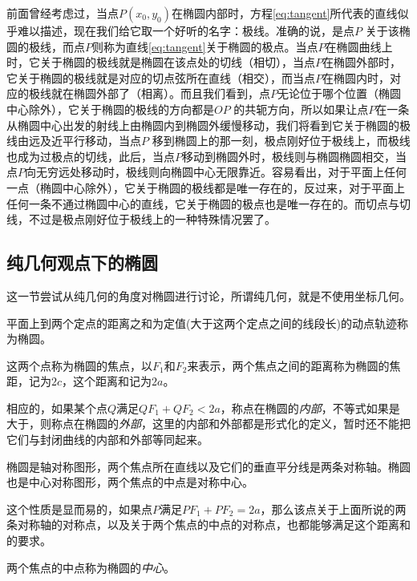 前面曾经考虑过，当点$P(x_0,y_0)$在椭圆内部时，方程\ref{eq:tangent}所代表的直线似乎难以描述，现在我们给它取一个好听的名字：极线。准确的说，是点$P$ 关于该椭圆的极线，而点$P$则称为直线\ref{eq:tangent}关于椭圆的极点。当点$P$在椭圆曲线上时，它关于椭圆的极线就是椭圆在该点处的切线（相切），当点$P$在椭圆外部时，它关于椭圆的极线就是对应的切点弦所在直线（相交），而当点$P$在椭圆内时，对应的极线就在椭圆外部了（相离）。而且我们看到，点$P$无论位于哪个位置（椭圆中心除外），它关于椭圆的极线的方向都是$OP$ 的共轭方向，所以如果让点$P$在一条从椭圆中心出发的射线上由椭圆内到椭圆外缓慢移动，我们将看到它关于椭圆的极线由远及近平行移动，当点$P$ 移到椭圆上的那一刻，极点刚好位于极线上，而极线也成为过极点的切线，此后，当点$P$移动到椭圆外时，极线则与椭圆椭圆相交，当点$P$向无穷远处移动时，极线则向椭圆中心无限靠近。容易看出，对于平面上任何一点（椭圆中心除外），它关于椭圆的极线都是唯一存在的，反过来，对于平面上任何一条不通过椭圆中心的直线，它关于椭圆的极点也是唯一存在的。而切点与切线，不过是极点刚好位于极线上的一种特殊情况罢了。

\subsection{纯几何观点下的椭圆}
\label{sec:oval-on-geometry}

这一节尝试从纯几何的角度对椭圆进行讨论，所谓纯几何，就是不使用坐标几何。

\begin{definition}
  平面上到两个定点的距离之和为定值(大于这两个定点之间的线段长)的动点轨迹称为椭圆。
\end{definition}

这两个点称为椭圆的焦点，以$F_1$和$F_2$来表示，两个焦点之间的距离称为椭圆的焦距，记为$2c$，这个距离和记为$2a$。

相应的，如果某个点$Q$满足$QF_1+QF_2<2a$，称点在椭圆的\emph{内部}，不等式如果是大于，则称点在椭圆的\emph{外部}，这里的内部和外部都是形式化的定义，暂时还不能把它们与封闭曲线的内部和外部等同起来。

\begin{property}
  椭圆是轴对称图形，两个焦点所在直线以及它们的垂直平分线是两条对称轴。椭圆也是中心对称图形，两个焦点的中点是对称中心。
\end{property}

这个性质是显而易的，如果点$P$满足$PF_1+PF_2=2a$，那么该点关于上面所说的两条对称轴的对称点，以及关于两个焦点的中点的对称点，也都能够满足这个距离和的要求。

两个焦点的中点称为椭圆的\emph{中心}。


